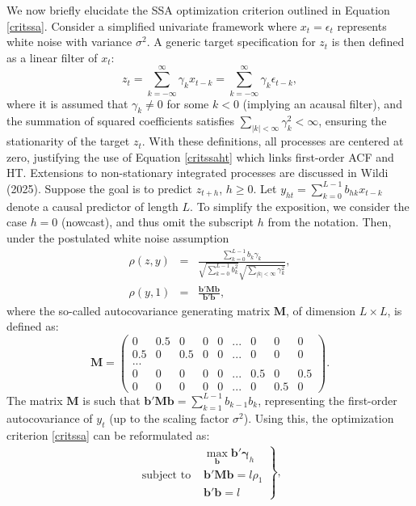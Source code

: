 \documentclass[11pt,a4paper]{article}
\begin{document}
We now briefly elucidate the SSA optimization criterion outlined in Equation \ref{critssa}. Consider a simplified univariate framework where $x_t=\epsilon_t$ represents white noise with variance $\sigma^2$. A generic target specification for $z_t$ is then defined as a linear filter of $x_t$:
\[z_t=\sum_{k=-\infty}^\infty \gamma_k x_{t-k}=\sum_{k=-\infty}^\infty \gamma_k \epsilon_{t-k},\] 
where it is assumed that $\gamma_k\neq 0$ for some $k<0$ (implying an acausal filter), and the summation of squared coefficients satisfies $\sum_{|k|<\infty}\gamma_k^2<\infty$, ensuring the stationarity of the target $z_t$. With these definitions, all processes are centered at zero, justifying the use of Equation \ref{critssaht} which links first-order ACF and HT. Extensions to non-stationary integrated processes are discussed in Wildi (2025). Suppose the goal is to predict  $z_{t+h}$, $h\geq 0$. Let  $y_{h t}=\sum_{k=0}^{L-1} b_{h k}x_{t-k}$  denote a causal predictor of length $L$.  To simplify the exposition, we consider the case $h=0$ (nowcast), and thus omit the subscript $h$ from the notation. Then, under the postulated white noise assumption
\begin{eqnarray*}
\rho(z,y)&=&\frac{\sum_{k=0}^{L-1}b_k\gamma_k}{\sqrt{\sum_{k=0}^{L-1}b_k^2}\sqrt{\sum_{|k|<\infty}\gamma_k^2}},\\
\rho(y,1)&=&\frac{\mathbf{b}'\mathbf{Mb}}{\mathbf{b}'\mathbf{b}},
\end{eqnarray*} 
where the so-called autocovariance generating matrix $\mathbf{M}$, of dimension $L\times L$, is defined as:
\[
\mathbf{M}=\left(\begin{array}{ccccccccc}0&0.5&0&0&0&...&0&0&0\\
0.5&0&0.5&0&0&...&0&0&0\\
...&&&&&&&&\\
0&0&0&0&0&...&0.5&0&0.5\\
0&0&0&0&0&...&0&0.5&0
\end{array}\right).
\]
The matrix $\mathbf{M}$ is such that $\mathbf{b}'\mathbf{Mb}=\sum_{k=1}^{L-1}b_{k-1}b_k$, representing the first-order autocovariance of $y_t$ (up to the scaling factor $\sigma^2$).  Using this, the optimization criterion \ref{critssa} can be reformulated as:
\begin{eqnarray}\label{crit1}
\left.\begin{array}{cc}
&\max_{\mathbf{b}}\mathbf{b}'\boldsymbol{\gamma}_{h}\\
\textrm{subject~to~}&\mathbf{b}'\mathbf{Mb}=l\rho_1\\
&\mathbf{b}'\mathbf{b}=l
\end{array}\right\},
\end{eqnarray}
\end{document}

